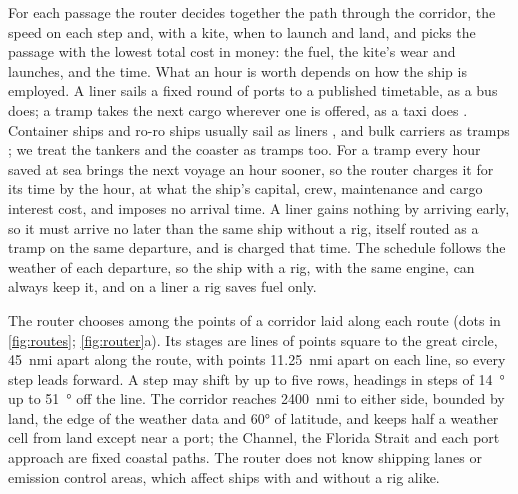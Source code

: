 For each passage the router decides together the path through the corridor, the speed on each step and, with a kite, when to launch and land, and picks the passage with the lowest total cost in money: the fuel, the kite's wear and launches, and the time. What an hour is worth depends on how the ship is employed. A liner sails a fixed round of ports to a published timetable, as a bus does; a tramp takes the next cargo wherever one is offered, as a taxi does \citep{chandra2015,emsa2023}. Container ships and ro-ro ships usually sail as liners \citep{chandra2015,man2011}, and bulk carriers as tramps \citep{man2011}; we treat the tankers and the coaster as tramps too. For a tramp every hour saved at sea brings the next voyage an hour sooner, so the router charges it for its time by the hour, at what the ship's capital, crew, maintenance and cargo interest cost, and imposes no arrival time. A liner gains nothing by arriving early, so it must arrive no later than the same ship without a rig, itself routed as a tramp on the same departure, and is charged that time. The schedule follows the weather of each departure, so the ship with a rig, with the same engine, can always keep it, and on a liner a rig saves fuel only.

The router chooses among the points of a corridor laid along each route (dots in \cref{fig:routes}; \cref{fig:router}a). Its stages are lines of points square to the great circle, \SI{45}{nmi} apart along the route, with points \SI{11.25}{nmi} apart on each line, so every step leads forward. A step may shift by up to five rows, headings in steps of \SI{14}{\degree} up to \SI{51}{\degree} off the line. The corridor reaches \SI{2400}{nmi} to either side, bounded by land, the edge of the weather data and \ang{60} of latitude, and keeps half a weather cell from land except near a port; the Channel, the Florida Strait and each port approach are fixed coastal paths.  The router does not know shipping lanes or emission control areas, which affect ships with and without a rig alike.

